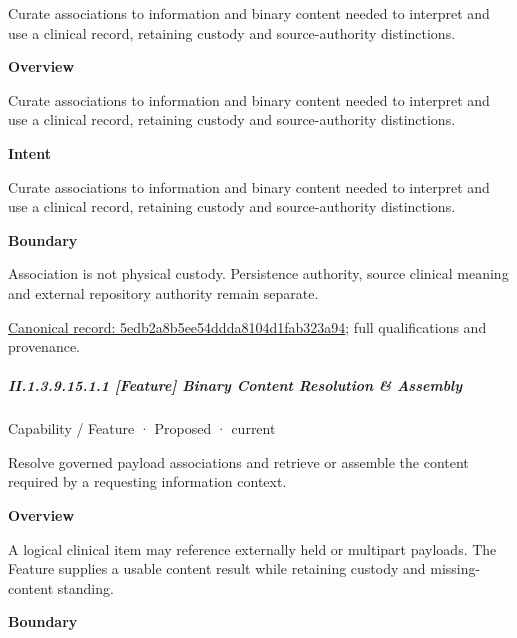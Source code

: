 Curate associations to information and binary content needed to interpret and use a clinical record, retaining custody and source-authority distinctions.



\textbf{Overview}



Curate associations to information and binary content needed to interpret and use a clinical record, retaining custody and source-authority distinctions.



\textbf{Intent}



Curate associations to information and binary content needed to interpret and use a clinical record, retaining custody and source-authority distinctions.



\textbf{Boundary}



Association is not physical custody. Persistence authority, source clinical meaning and external repository authority remain separate.


{\footnotesize \href{../../../../../../../continuum/strategy/capability/5edb2a8b5ee54ddda8104d1fab323a94.md}{Canonical record: 5edb2a8b5ee54ddda8104d1fab323a94}; full qualifications and provenance.}\par
\subparagraph*{II.1.3.9.15.1.1 [Feature] Binary Content Resolution \& Assembly}
\label{navigation:II.1.3.9.15.1.1}

\label{element:8fb4036f7a9c47c3883b2507528fab5e}
{\small Capability / Feature · Proposed · current}\par

Resolve governed payload associations and retrieve or assemble the content required by a requesting information context.



\textbf{Overview}



A logical clinical item may reference externally held or multipart payloads. The Feature supplies a usable content result while retaining custody and missing-content standing.



\textbf{Boundary}



